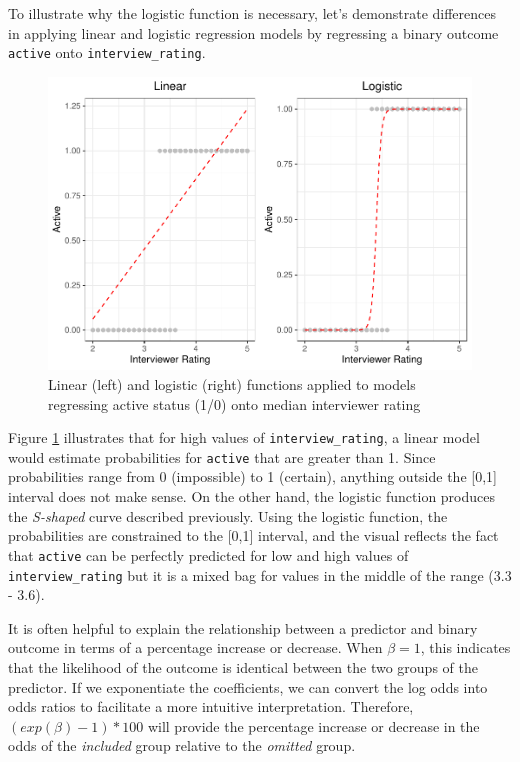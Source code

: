 \documentclass[
]{book}
\begin{document}
To illustrate why the logistic function is necessary, let's demonstrate differences in applying linear and logistic regression models by regressing a binary outcome \texttt{active} onto \texttt{interview\_rating}.

\begin{figure}

{\centering \includegraphics[width=1\linewidth]{The_Fundamentals_of_People_Analytics_files/figure-latex/lm-glm-compare-1} 

}

\caption{Linear (left) and logistic (right) functions applied to models regressing active status (1/0) onto median interviewer rating}\label{fig:lm-glm-compare}
\end{figure}

Figure \ref{fig:lm-glm-compare} illustrates that for high values of \texttt{interview\_rating}, a linear model would estimate probabilities for \texttt{active} that are greater than 1. Since probabilities range from 0 (impossible) to 1 (certain), anything outside the {[}0,1{]} interval does not make sense. On the other hand, the logistic function produces the \emph{S-shaped} curve described previously. Using the logistic function, the probabilities are constrained to the {[}0,1{]} interval, and the visual reflects the fact that \texttt{active} can be perfectly predicted for low and high values of \texttt{interview\_rating} but it is a mixed bag for values in the middle of the range (3.3 - 3.6).

It is often helpful to explain the relationship between a predictor and binary outcome in terms of a percentage increase or decrease. When \(\beta = 1\), this indicates that the likelihood of the outcome is identical between the two groups of the predictor. If we exponentiate the coefficients, we can convert the log odds into odds ratios to facilitate a more intuitive interpretation. Therefore, \((exp(\beta) - 1) * 100\) will provide the percentage increase or decrease in the odds of the \emph{included} group relative to the \emph{omitted} group.
\end{document}
